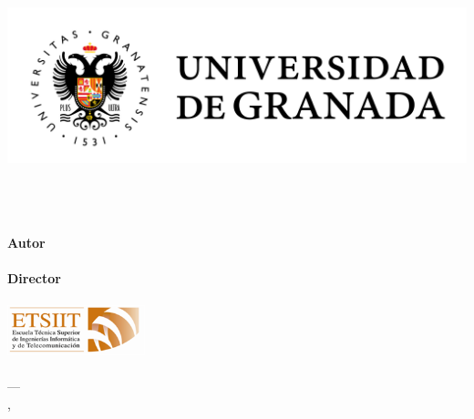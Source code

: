 \begin{titlepage}
 
 
\newlength{\centeroffset}
\setlength{\centeroffset}{-0.5\oddsidemargin}
\addtolength{\centeroffset}{0.5\evensidemargin}
\thispagestyle{empty}

\noindent\hspace*{\centeroffset}\begin{minipage}{\textwidth}

\centering
\includegraphics[width=1.0\textwidth]{images/logo_ugr.jpg}\\[1.3cm]

\textsc{ \Large \mySubject\\[0.2cm]}
\textsc{ \myDegree}\\[1cm]
% 
\vspace{0.3cm}
{\huge\bfseries \myTitle\\
}
\vspace{0.7cm}
\end{minipage}

\vspace{2.5cm}
\noindent\hspace*{\centeroffset}\begin{minipage}{\textwidth}
\centering

\textbf{Autor}\\ {\myName}\\[2.5ex]
\textbf{Director}\\ {\myProf}\\[2cm]
\includegraphics[width=0.3\textwidth]{images/etsiit_logo.png}\\[0.1cm]
\textsc{\myFaculty}\\
\textsc{---}\\
\myLocation, \myTimeES
\end{minipage}
\end{titlepage}
